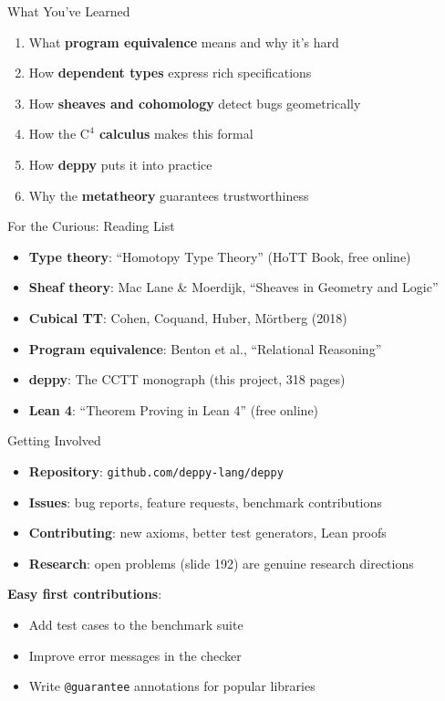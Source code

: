 \documentclass[aspectratio=169,11pt]{beamer}
\newcommand{\Cfour}{\mathrm{C}^4}
\begin{document}
\begin{frame}{What You've Learned}
\begin{enumerate}
\item What \textbf{program equivalence} means and why it's hard
\item How \textbf{dependent types} express rich specifications
\item How \textbf{sheaves and cohomology} detect bugs geometrically
\item How the \textbf{$\Cfour$ calculus} makes this formal
\item How \textbf{deppy} puts it into practice
\item Why the \textbf{metatheory} guarantees trustworthiness
\end{enumerate}
\end{frame}

\begin{frame}{For the Curious: Reading List}
\begin{itemize}
\item \textbf{Type theory}: ``Homotopy Type Theory'' (HoTT Book, free online)
\item \textbf{Sheaf theory}: Mac Lane \& Moerdijk, ``Sheaves in Geometry and Logic''
\item \textbf{Cubical TT}: Cohen, Coquand, Huber, M\"ortberg (2018)
\item \textbf{Program equivalence}: Benton et al., ``Relational Reasoning''
\item \textbf{deppy}: The CCTT monograph (this project, 318 pages)
\item \textbf{Lean 4}: ``Theorem Proving in Lean 4'' (free online)
\end{itemize}
\end{frame}

\begin{frame}{Getting Involved}
\begin{itemize}
\item \textbf{Repository}: \texttt{github.com/deppy-lang/deppy}
\item \textbf{Issues}: bug reports, feature requests, benchmark contributions
\item \textbf{Contributing}: new axioms, better test generators, Lean proofs
\item \textbf{Research}: open problems (slide 192) are genuine research directions
\end{itemize}

\vspace{0.5em}
\textbf{Easy first contributions}:
\begin{itemize}
\item Add test cases to the benchmark suite
\item Improve error messages in the checker
\item Write \texttt{@guarantee} annotations for popular libraries
\end{itemize}
\end{frame}
\end{document}
